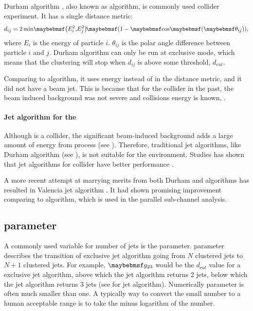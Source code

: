 Durham algorithm \cite{Catani:1991hj}, also known as \ee \kt algorithm, is commonly used \ee collider experiment. It has a single distance metric:
\begin{equation}
d_{ij} = 2\min\!\parenths{E_i^2,\!E_j^2}\!\parenths{1 - \cosOf{\theta_{ij}}},
\end{equation}
where $E_i$ is the energy of particle $i$. $\theta_{ij}$ is the polar angle difference between particle $i$ and $j$. Durham algorithm can only be run at exclusive mode, which means that the clustering will stop when $d_{ij}$ is above some threshold, $d_{cut}$.

Comparing to \kt algorithm, it uses energy instead of \pT in the distance metric, and it did not have a beam jet. This is because that for the \ee collider in the past, the beam induced background was not severe and collisions energy is known, \sqrtS.

\paragraph{Jet algorithm for the \CLIC}

Although \CLIC is a \ee collider, the significant beam-induced background adds a large amount of energy from \ggHad process (see \Section{}). Therefore, traditional \ee jet algorithms, like Durham algorithm (see \Section{}), is not suitable for the \CLIC environment. Studies has shown that jet algorithms for \pp collider have better performance \cite{Linssen:2012hp,LCD-Note-2010-006}.

A more recent attempt at marrying merits from both Durham and \kt algorithms has resulted in Valencia jet algorithm \cite{Boronat:2014hva}. It had shown promising improvement comparing to \kt algorithm, which is used in the parallel  \eeToHHbbbb  sub-channel analysis.

\subsection{\y{} parameter}
A commonly used variable for number of jets is the \y{} parameter. \y{} parameter describes the transition of exclusive jet algorithm going from $N$ clustered jets to $N\!+\!1$ clustered jets. For example, $\y{23}$ would be the $d_{cut}$ value for a exclusive jet algorithm, above which the jet algorithm returns 2 jets, below which the jet algorithm returns 3 jets (see  for jet algorithm). Numerically \y{} parameter is often much smaller than one. A typically way to convert the small number to a human acceptable range is to take the minus logarithm of the number.


